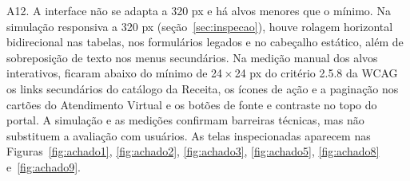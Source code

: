 \documentclass[
  12pt,
  oneside,
  a4paper,
  chapter=TITLE,
  section=TITLE,
  english,
  brazilian
]{abntex2}
\begin{document}
A12. A interface não se adapta a 320 px e há alvos menores que o mínimo. Na simulação responsiva a 320 px (seção~\ref{sec:inspecao}), houve rolagem horizontal bidirecional nas tabelas, nos formulários legados e no cabeçalho estático, além de sobreposição de texto nos menus secundários. Na medição manual dos alvos interativos, ficaram abaixo do mínimo de 24\,$\times$\,24 px do critério 2.5.8 da WCAG \cite{wcag22} os links secundários do catálogo da Receita, os ícones de ação e a paginação nos cartões do Atendimento Virtual e os botões de fonte e contraste no topo do portal. A simulação e as medições confirmam barreiras técnicas, mas não substituem a avaliação com usuários. As telas inspecionadas aparecem nas Figuras~\ref{fig:achado1}, \ref{fig:achado2}, \ref{fig:achado3}, \ref{fig:achado5}, \ref{fig:achado8} e~\ref{fig:achado9}.
\end{document}
